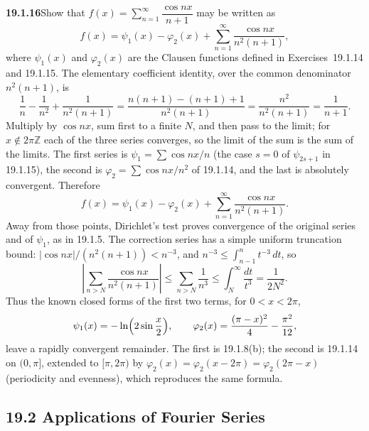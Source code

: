 \par\bigskip
\noindent\textbf{19.1.16}\quad Show that
$f(x)=\displaystyle\sum_{n=1}^{\infty}\dfrac{\cos nx}{n+1}$ may be
written as
\[
f(x)=\psi_{1}(x)-\varphi_{2}(x)
+\sum_{n=1}^{\infty}\frac{\cos nx}{n^{2}(n+1)},
\]
where $\psi_{1}(x)$ and $\varphi_{2}(x)$ are the Clausen functions
defined in Exercises~19.1.14 and 19.1.15.
\solution
The elementary coefficient identity, over the common denominator
$n^2(n+1)$, is
\[
\frac1n-\frac1{n^2}+\frac1{n^2(n+1)}
=\frac{n(n+1)-(n+1)+1}{n^2(n+1)}
=\frac{n^2}{n^2(n+1)}
=\frac1{n+1}.
\]
Multiply by $\cos nx$, sum first to a finite $N$, and then pass to the
limit; for $x\notin2\pi\mathbb Z$ each of the three series converges, so
the limit of the sum is the sum of the limits. The first series is
$\psi_1=\sum\cos nx/n$ (the case $s=0$ of $\psi_{2s+1}$ in 19.1.15),
the second is $\varphi_2=\sum\cos nx/n^2$ of 19.1.14, and the last is
absolutely convergent. Therefore
\[
\boxed{f(x)=\psi_1(x)-\varphi_2(x)
+\sum_{n=1}^{\infty}\frac{\cos nx}{n^2(n+1)}.}
\]
Away from those points, Dirichlet's test proves convergence of the
original series and of $\psi_1$, as in 19.1.5. The correction series has
a simple uniform truncation bound: $|\cos nx|/(n^2(n+1))<n^{-3}$, and
$n^{-3}\le\int_{n-1}^n t^{-3}\,dt$, so
\[
\left|\sum_{n>N}\frac{\cos nx}{n^2(n+1)}\right|
\le\sum_{n>N}\frac1{n^3}\le\int_N^\infty\frac{dt}{t^3}
=\frac1{2N^2}.
\]
Thus the known closed forms of the first two terms, for $0<x<2\pi$,
\[
\psi_1(x)=-\ln\Bigl(2\sin\frac x2\Bigr),\qquad
\varphi_2(x)=\frac{(\pi-x)^2}4-\frac{\pi^2}{12},
\]
leave a rapidly convergent remainder. The first is 19.1.8(b); the second
is 19.1.14 on $(0,\pi]$, extended to $[\pi,2\pi)$ by
$\varphi_2(x)=\varphi_2(x-2\pi)=\varphi_2(2\pi-x)$ (periodicity and
evenness), which reproduces the same formula.

\subsection*{19.2 Applications of Fourier Series}

